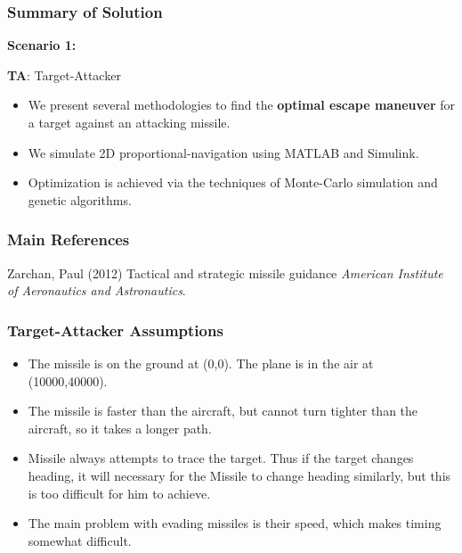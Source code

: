 \documentclass{beamer}
\begin{document}
\begin{frame}
\frametitle{Summary of Solution}
\textbf{Scenario 1:}
\begin{block}{\textbf{TA}: Target-Attacker}
	\begin{itemize}
		\item We present several methodologies to find the \textbf{optimal escape maneuver} for a target against an attacking missile. 
		\item We simulate 2D proportional-navigation using MATLAB and Simulink.
		\item Optimization is achieved via the techniques of Monte-Carlo simulation and genetic algorithms.
	\end{itemize}
\end{block}
\end{frame}
\begin{frame}
\frametitle{Main References}
\footnotesize{
	\begin{thebibliography}{99} %
		 Zarchan, Paul (2012)
		\newblock Tactical and strategic missile guidance
		\newblock \emph{American Institute of Aeronautics and Astronautics}.
	\end{thebibliography}
}
\end{frame}

\begin{frame}
\frametitle{Target-Attacker Assumptions}

\begin{itemize}
	\item The missile is on the ground at (0,0). The plane is in the air at (10000,40000).
	\item The missile is faster than the aircraft, but cannot turn tighter than the aircraft, so it takes a longer path.
	\item Missile always attempts to trace the target. Thus if the target changes heading, it will necessary for the Missile to change heading similarly, but this is too difficult for him to achieve.
	\item  The main problem with evading missiles is their speed, which makes timing somewhat difficult.
\end{itemize}
\end{frame}
\end{document}
